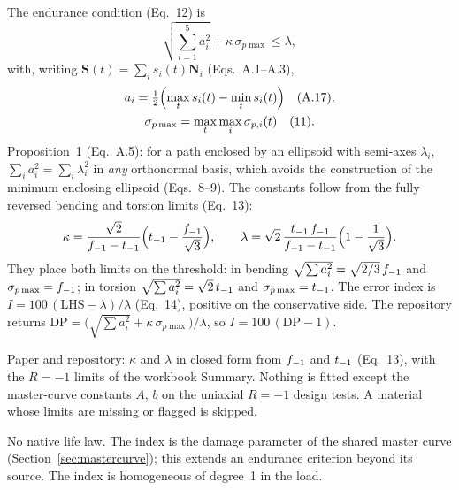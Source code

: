  The endurance condition (Eq.~12) is
\begin{equation}
\sqrt{\sum_{i=1}^{5} a_i^2} + \kappa\,\sigma_{p\max} \le \lambda ,
\label{eq:gam-main}
\end{equation}
with, writing $\mathbf S(t)=\sum_i s_i(t)\mathbf N_i$ (Eqs.~A.1--A.3),
\begin{gather}
a_i = \tfrac12\Bigl(\max_t s_i(t) - \min_t s_i(t)\Bigr) \quad\text{(A.17)}, \label{eq:gam-ai}\\
\sigma_{p\max} = \max_t \max_i \sigma_{p,i}(t) \quad\text{(11)}. \label{eq:gam-sp}
\end{gather}
Proposition~1 (Eq.~A.5): for a path enclosed by an ellipsoid with semi-axes $\lambda_i$,
$\sum_i a_i^2=\sum_i\lambda_i^2$ in \emph{any} orthonormal basis, which avoids the construction of the
minimum enclosing ellipsoid (Eqs.~8--9). The constants follow from the fully reversed bending and
torsion limits (Eq.~13):
\begin{equation}
\kappa = \frac{\sqrt2}{f_{-1}-t_{-1}}\Bigl(t_{-1} - \frac{f_{-1}}{\sqrt3}\Bigr) , \qquad
\lambda = \sqrt2\,\frac{t_{-1}\,f_{-1}}{f_{-1}-t_{-1}}\Bigl(1 - \frac{1}{\sqrt3}\Bigr) .
\label{eq:gam-const}
\end{equation}
They place both limits on the threshold: in bending $\sqrt{\sum a_i^2}=\sqrt{2/3}\,f_{-1}$ and
$\sigma_{p\max}=f_{-1}$; in torsion $\sqrt{\sum a_i^2}=\sqrt2\,t_{-1}$ and $\sigma_{p\max}=t_{-1}$. The error
index is $I=100\,(\mathrm{LHS}-\lambda)/\lambda$ (Eq.~14), positive on the conservative side. The
repository returns $\mathrm{DP}=\bigl(\sqrt{\sum a_i^2}+\kappa\,\sigma_{p\max}\bigr)/\lambda$, so
$I=100\,(\mathrm{DP}-1)$.

 Paper and repository: $\kappa$ and $\lambda$ in closed form from
$f_{-1}$ and $t_{-1}$ (Eq.~13), with the $R=-1$ limits of the workbook Summary. Nothing is fitted except the
master-curve constants $A$, $b$ on the uniaxial $R=-1$ design tests. A material whose limits are
missing or flagged is skipped.

 No native life law. The index is the damage parameter of the shared master curve
(Section~\ref{sec:mastercurve}); this extends an endurance criterion beyond its source. The index is
homogeneous of degree~1 in the load.

